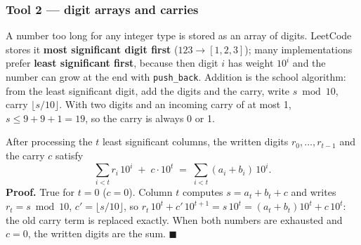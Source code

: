\subsubsection*{Tool 2 --- digit arrays and carries}

A number too long for any integer type is stored as an array of digits. LeetCode stores it \textbf{most significant digit first} ($123 \to [1,2,3]$); many implementations prefer \textbf{least significant first}, because then digit $i$ has weight $10^i$ and the number can grow at the end with \texttt{push\_back}. Addition is the school algorithm: from the least significant digit, add the digits and the carry, write $s \bmod 10$, carry $\lfloor s / 10 \rfloor$. With two digits and an incoming carry of at most 1, $s \le 9 + 9 + 1 = 19$, so the carry is always 0 or 1.

\begin{diagrambox}
\end{diagrambox}

\begin{invariantbox}
After processing the $t$ least significant columns, the written digits $r_0, \dots, r_{t-1}$ and the carry $c$ satisfy
\[
\sum_{i<t} r_i\,10^{i} \;+\; c\cdot 10^{t} \;=\; \sum_{i<t} (a_i + b_i)\,10^{i}.
\]
\textbf{Proof.} True for $t = 0$ ($c = 0$). Column $t$ computes $s = a_t + b_t + c$ and writes $r_t = s \bmod 10$, $c' = \lfloor s/10 \rfloor$, so $r_t\,10^t + c'\,10^{t+1} = s\,10^t = (a_t + b_t)10^t + c\,10^t$: the old carry term is replaced exactly. When both numbers are exhausted and $c = 0$, the written digits are the sum. \hfill$\blacksquare$
\end{invariantbox}

